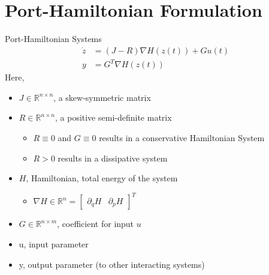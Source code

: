 \section{Port-Hamiltonian Formulation}

\begin{frame}{Port-Hamiltonian Systems}
    \begin{align*}
        \dot{z} &= (J-R)\nabla H(z(t)) + Gu(t) \\
        y &= G^T\nabla H(z(t))
    \end{align*}
    Here, \cite{van2006port}
    \begin{itemize}
        \item $J\in \mathbb{R}^{n \times n}$, a skew-symmetric matrix
        \item $R\in \mathbb{R}^{n \times n}$, a positive semi-definite matrix
        \begin{itemize}
            \item $R \equiv 0$ and $G \equiv 0$ results in a conservative Hamiltonian System
            \item $R > 0$ results in a dissipative system 
        \end{itemize}
        \item $H$, Hamiltonian, total energy of the system
        \begin{itemize}
            \item $\nabla H \in \mathbb{R}^{n} = \begin{bmatrix} \partial_q H & \partial_p H \end{bmatrix}^T$
        \end{itemize}
        \item $G\in \mathbb{R}^{n \times m}$, coefficient for input $u$
        \item u, input parameter
        \item y, output parameter (to other interacting systems)
    \end{itemize}
\end{frame}


